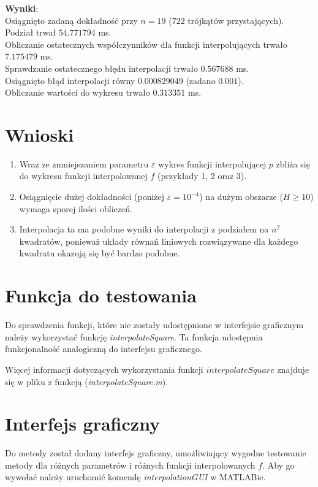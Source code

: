\documentclass[12pt]{article}
\begin{document}
\begin{enumerate}[label=\textbf{Przykład \arabic*}]
		\textbf{Wyniki}:\\
		Osiągnięto zadaną dokładność przy $n = 19$ ($722$ trójkątów przystających).\\
		Podział trwał $54.771794$ ms.\\
		Obliczanie ostatecznych współczynników dla funkcji interpolujących trwało $7.175479$ ms.\\
		Sprawdzanie ostatecznego błędu interpolacji trwało $0.567688$ ms.\\
		Osiągnięto błąd interpolacji równy $0.000829049$ (zadano $0.001$).\\
		Obliczanie wartości do wykresu trwało $0.313351$ ms.
	\end{enumerate}
	
	
	\section{Wnioski}
	\begin{enumerate}
		\item Wraz ze zmniejszaniem parametru $\varepsilon$ wykres funkcji interpolującej $p$ zbliża się do wykresu funkcji interpolowanej $f$ (przykłady 1, 2 oraz 3).

		\item Osiągnięcie dużej dokładności (poniżej $\varepsilon = 10^{-4}$) na dużym obszarze ($H \geq 10$) wymaga sporej ilości obliczeń.
		
		\item Interpolacja ta ma podobne wyniki do interpolacji z podziałem na $n^2$ kwadratów, ponieważ układy równań liniowych rozwiązywane dla każdego kwadratu okazują się być bardzo podobne.
	\end{enumerate}

	
	\section{Funkcja do testowania}
	Do sprawdzenia funkcji, które nie zostały udostępnione w interfejsie graficznym należy wykorzystać funkcję \textit{interpolateSquare}. Ta funkcja udostępnia funkcjonalność analogiczną do interfejsu graficznego.
	
	Więcej informacji dotyczących wykorzystania funkcji $interpolateSquare$ znajduje się w pliku z funkcją (\textit{interpolateSquare.m}).
	
	\section{Interfejs graficzny}
	Do metody został dodany interfejs graficzny, umożliwiający wygodne testowanie metody dla różnych parametrów i różnych funkcji interpolowanych $f$. Aby go wywołać należy uruchomić komendę \textit{interpolationGUI} w MATLABie.
	
\end{document}
